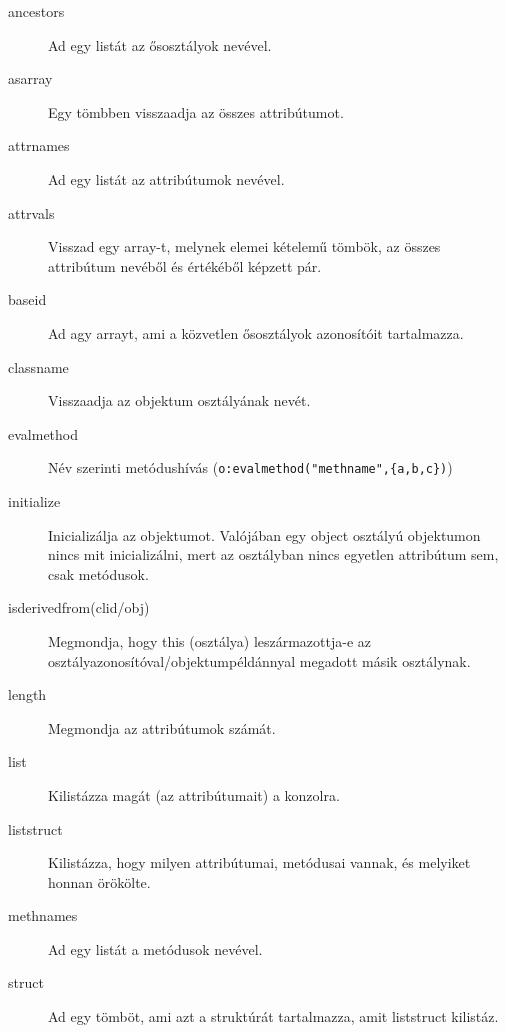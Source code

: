 \begin{description}
\item[ancestors]
  Ad egy listát az ősosztályok nevével.

\item[asarray]
  Egy tömbben visszaadja az összes attribútumot.

\item[attrnames]
  Ad egy listát az attribútumok nevével.

\item[attrvals] 
  Visszad egy array-t, melynek elemei kételemű tömbök,
  az összes attribútum nevéből és értékéből képzett pár.

\item[baseid]
  Ad agy arrayt, ami a közvetlen ősosztályok azonosítóit tartalmazza.

\item[classname] 
  Visszaadja az objektum osztályának nevét.

\item[evalmethod] 
  Név szerinti metódushívás (\verb!o:evalmethod("methname",{a,b,c})!)

\item[initialize]
  Inicializálja az objektumot.
  Valójában egy object osztályú objektumon nincs mit inicializálni,
  mert az osztályban nincs egyetlen attribútum sem, csak metódusok.

\item[isderivedfrom(clid/obj)]
  Megmondja, hogy this (osztálya) leszármazottja-e az
  osztályazonosítóval/objektumpéldánnyal megadott másik osztálynak.

\item[length]
  Megmondja az attribútumok számát.

\item[list]
  Kilistázza magát (az attribútumait) a konzolra. 

\item[liststruct]
  Kilistázza, hogy milyen attribútumai, metódusai vannak,
  és melyiket honnan örökölte.

\item[methnames]
  Ad egy listát a metódusok nevével.

\item[struct]
  Ad egy tömböt, ami azt a struktúrát tartalmazza, amit liststruct
  kilistáz.
\end{description}

